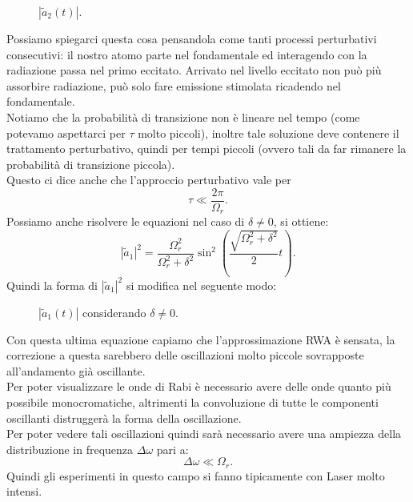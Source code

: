 \begin{figure}[H]
    \centering
    \caption{$\left|\tilde{a}_2(t) \right|$.}
    \label{1111}
\end{figure}
Possiamo spiegarci questa cosa pensandola come tanti processi perturbativi consecutivi: il nostro atomo parte nel fondamentale ed interagendo con la radiazione passa nel primo eccitato. 
Arrivato nel livello eccitato non può più assorbire radiazione, può solo fare emissione stimolata ricadendo nel fondamentale.\\
Notiamo che la probabilità di transizione non è lineare nel tempo (come potevamo aspettarci per $\tau$ molto piccoli), inoltre tale soluzione deve contenere il trattamento perturbativo, quindi per tempi piccoli (ovvero tali da far rimanere la probabilità di transizione piccola). \\
Questo ci dice anche che l'approccio perturbativo vale per 
\[
\tau \ll \frac{2\pi}{\Omega_r}
.\] 
Possiamo anche risolvere le equazioni nel caso di $\delta \neq 0$, si ottiene:
\[
\left|\tilde{a}_1\right|^2= \frac{\Omega^2_r}{\Omega_r^2+\delta^2}
\sin^2\left(\frac{\sqrt{\Omega^2_r + \delta^2}}{2}t\right)
.\] 
Quindi la forma di $\left|\tilde{a}_1\right|^2$ si modifica nel seguente modo:
\begin{figure}[H]
    \centering
    \caption{$\left|\tilde{a}_1(t)\right|$ considerando $\delta\neq 0$.}
    \label{delta non nullo}
\end{figure}
Con questa ultima equazione capiamo che l'approssimazione RWA è sensata, la correzione a questa sarebbero delle oscillazioni molto piccole sovrapposte all'andamento già oscillante. \\
Per poter visualizzare le onde di Rabi è necessario avere delle onde quanto più possibile monocromatiche, altrimenti la convoluzione di tutte le componenti oscillanti distruggerà la forma della oscillazione. \\
Per poter vedere tali oscillazioni quindi sarà necessario avere una ampiezza della distribuzione in frequenza $\Delta\omega$ pari a:
\[
\Delta\omega\ll\Omega_r
.\] 
Quindi gli esperimenti in questo campo si fanno tipicamente con Laser molto intensi.
